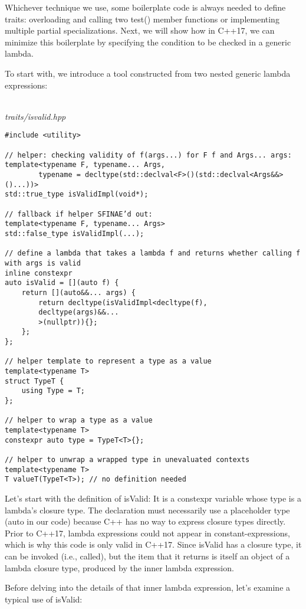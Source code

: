 Whichever technique we use, some boilerplate code is always needed to define traits: overloading and calling two test() member functions or implementing multiple partial specializations. Next, we will show how in C++17, we can minimize this boilerplate by specifying the condition to be checked in a generic lambda.

To start with, we introduce a tool constructed from two nested generic lambda expressions:

\hspace*{\fill} \\ %
\noindent
\textit{traits/isvalid.hpp}
\begin{lstlisting}[style=styleCXX]
#include <utility>

// helper: checking validity of f(args...) for F f and Args... args:
template<typename F, typename... Args,
		typename = decltype(std::declval<F>()(std::declval<Args&&>()...))>
std::true_type isValidImpl(void*);

// fallback if helper SFINAE’d out:
template<typename F, typename... Args>
std::false_type isValidImpl(...);

// define a lambda that takes a lambda f and returns whether calling f with args is valid
inline constexpr
auto isValid = [](auto f) {
	return [](auto&&... args) {
		return decltype(isValidImpl<decltype(f),
		decltype(args)&&...
		>(nullptr)){};
	};
};

// helper template to represent a type as a value
template<typename T>
struct TypeT {
	using Type = T;
};

// helper to wrap a type as a value
template<typename T>
constexpr auto type = TypeT<T>{};

// helper to unwrap a wrapped type in unevaluated contexts
template<typename T>
T valueT(TypeT<T>); // no definition needed
\end{lstlisting}

Let’s start with the definition of isValid: It is a constexpr variable whose type is a lambda’s closure type. The declaration must necessarily use a placeholder type (auto in our code) because C++ has no way to express closure types directly. Prior to C++17, lambda expressions could not appear in constant-expressions, which is why this code is only valid in C++17. Since isValid has a closure type, it can be invoked (i.e., called), but the item that it returns is itself an object of a lambda closure type, produced by the inner lambda expression.

Before delving into the details of that inner lambda expression, let’s examine a typical use of isValid:

